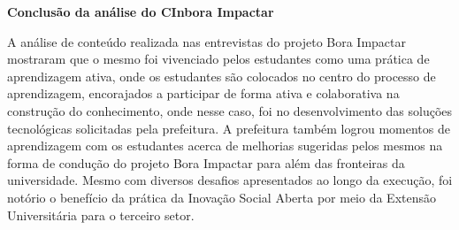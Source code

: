 \textbf{Conclusão da análise do CInbora Impactar}

A análise de conteúdo realizada nas entrevistas do projeto Bora Impactar mostraram que o mesmo foi vivenciado pelos estudantes como uma prática de aprendizagem ativa, onde os estudantes são colocados no centro do processo de aprendizagem, encorajados a participar de forma ativa e colaborativa na construção do conhecimento, onde nesse caso, foi no desenvolvimento das soluções tecnológicas solicitadas pela prefeitura. A prefeitura também logrou momentos de aprendizagem com os estudantes acerca de melhorias sugeridas pelos mesmos na forma de condução do projeto Bora Impactar para além das fronteiras da universidade. Mesmo com diversos desafios apresentados ao longo da execução, foi notório o benefício da prática da Inovação Social Aberta por meio da Extensão Universitária para o terceiro setor.

